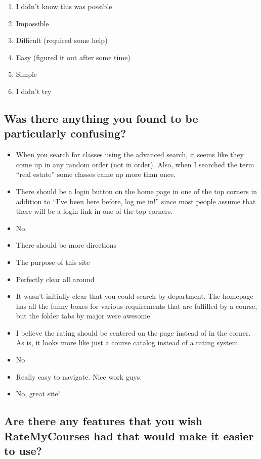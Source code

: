 \documentclass[12pt]{report}
\begin{document}
\begin{enumerate}
\item I didn't know this was possible
\item Impossible
\item Difficult (required some help)
\item Easy (figured it out after some time)
\item Simple
\item I didn't try
\end{enumerate}

\subsection*{Was there anything you found to be particularly confusing?}

\begin{itemize}
\item When you search for classes using the advanced search, it seems like they come up in any random order (not in order). Also, when I searched the term ``real estate'' some classes came up more than once.
\item There should be a login button on the home page in one of the top corners in addition to ``I've been here before, log me in!'' since most people assume that there will be a login link in one of the top corners.
\item No.
\item There should be more directions
\item The purpose of this site
\item Perfectly clear all around
\item It wasn't initially clear that you could search by department. The homepage has all the funny boxes for various requirements that are fulfilled by a course, but the folder tabs by major were awesome
\item I believe the rating should be centered on the page instead of in the corner. As is, it looks more like just a course catalog instead of a rating system.
\item No
\item Really easy to navigate. Nice work guys.
\item No, great site!
\end{itemize}

\subsection*{Are there any features that you wish RateMyCourses had that would make it easier to use?}
\end{document}
